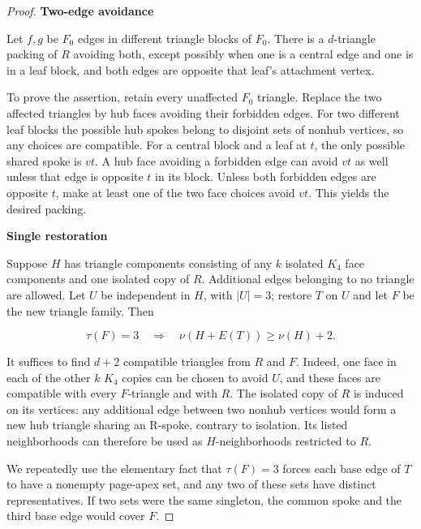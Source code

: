 \documentclass[11pt]{article}
\theoremstyle{definition}\newtheorem{definition}[theorem]{Definition}
\theoremstyle{remark}\newtheorem{remark}[theorem]{Remark}
\begin{document}
\begin{proof}
\par\medskip\noindent\textbf{Two-edge avoidance}\label{two-edge-avoidance}

Let \(f,g\) be \(F_0\) edges in different triangle blocks of \(F_0\). There is a \(d\)-triangle packing of \(R\) avoiding both, except possibly when one is a central edge and one is in a leaf block, and both edges are opposite that leaf's attachment vertex.

To prove the assertion, retain every unaffected \(F_0\) triangle. Replace the two affected triangles by hub faces avoiding their forbidden edges. For two different leaf blocks the possible hub spokes belong to disjoint sets of nonhub vertices, so any choices are compatible. For a central block and a leaf at \(t\), the only possible shared spoke is \(vt\). A hub face avoiding a forbidden edge can avoid \(vt\) as well unless that edge is opposite \(t\) in its block. Unless both forbidden edges are opposite \(t\), make at least one of the two face choices avoid \(vt\). This yields the desired packing.

\par\medskip\noindent\textbf{Single restoration}\label{single-restoration}

Suppose \(H\) has triangle components consisting of any \(k\) isolated \(K_4\) face components and one isolated copy of \(R\). Additional edges belonging to no triangle are allowed. Let \(U\) be independent in \(H\), with \(|U|=3\); restore \(T\) on \(U\) and let \(F\) be the new triangle family. Then

\begin{equation}
\tau(F)=3\quad\Longrightarrow\quad
\nu(H+E(T))\ge\nu(H)+2.
\end{equation}

It suffices to find \(d+2\) compatible triangles from \(R\) and \(F\). Indeed, one face in each of the other \(k\) \(K_4\) copies can be chosen to avoid \(U\), and these faces are compatible with every \(F\)-triangle and with \(R\). The isolated copy of \(R\) is induced on its vertices: any additional edge between two nonhub vertices would form a new hub triangle sharing an R-spoke, contrary to isolation. Its listed neighborhoods can therefore be used as \(H\)-neighborhoods restricted to \(R\).

We repeatedly use the elementary fact that \(\tau(F)=3\) forces each base edge of \(T\) to have a nonempty page-apex set, and any two of these sets have distinct representatives. If two sets were the same singleton, the common spoke and the third base edge would cover \(F\).


\end{proof}
\end{document}
